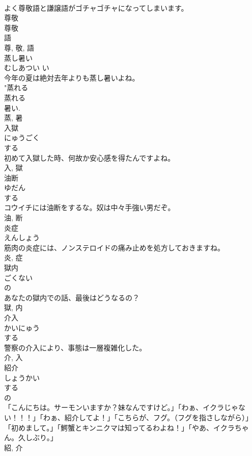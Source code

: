 \documentclass[8pt]{extreport}
\begin{document}
\begin{CJK}{UTF8}{min}
\\	よく尊敬語と謙譲語がゴチャゴチャになってしまいます。	
\\	尊敬 
\\	尊敬 
\\	語 
\\	尊, 敬, 語	
\\	蒸し暑い	
\\	むしあつい	い 
\\	今年の夏は絶対去年よりも蒸し暑いよね。	
\\	"蒸れる 
\\	蒸れる 
\\	暑い. 
\\	蒸, 暑	
\\	入獄	
\\	にゅうごく	
\\	する 
\\	初めて入獄した時、何故か安心感を得たんですよね。	
\\	入, 獄	
\\	油断	
\\	ゆだん	
\\	する 
\\	コウイチには油断をするな。奴は中々手強い男だぞ。	
\\	油, 断	
\\	炎症	
\\	えんしょう	
\\	筋肉の炎症には、ノンステロイドの痛み止めを処方しておきますね。	
\\	炎, 症	
\\	獄内	
\\	ごくない	
\\	の 
\\	あなたの獄内での話、最後はどうなるの？	
\\	獄, 内	
\\	介入	
\\	かいにゅう	
\\	する 
\\	警察の介入により、事態は一層複雑化した。	
\\	介, 入	
\\	紹介	
\\	しょうかい	
\\	する 
\\	の 
\\	「こんにちは。サーモンいますか？妹なんですけど。」「わぁ、イクラじゃない！！！」「わぁ、紹介してよ！」「こちらが、フグ。（フグを指さしながら）」「初めまして。」「鰐蟹とキンニクマは知ってるわよね！」「やあ、イクラちゃん。久しぶり。」	
\\	紹, 介	

\end{CJK}
\end{document}
